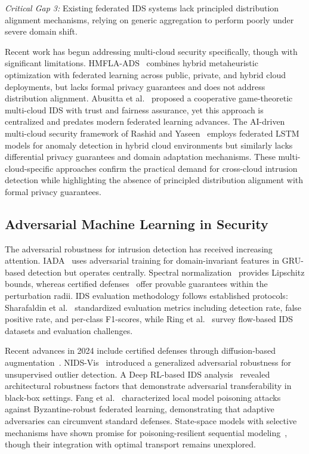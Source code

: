\documentclass{ieeeaccess}
\theoremstyle{plain}
\theoremstyle{definition}
\theoremstyle{remark}
\begin{document}
\textit{Critical Gap 3:} Existing federated IDS systems lack principled distribution alignment mechanisms, relying on generic aggregation to perform poorly under severe domain shift.

Recent work has begun addressing multi-cloud security specifically, though with significant limitations. HMFLA-ADS~\cite{hmfla2025} combines hybrid metaheuristic optimization with federated learning across public, private, and hybrid cloud deployments, but lacks formal privacy guarantees and does not address distribution alignment. Abusitta et al.~\cite{abusitta2019} proposed a cooperative game-theoretic multi-cloud IDS with trust and fairness assurance, yet this approach is centralized and predates modern federated learning advances. The AI-driven multi-cloud security framework of Rashid and Yaseen~\cite{rashid2025} employs federated LSTM models for anomaly detection in hybrid cloud environments but similarly lacks differential privacy guarantees and domain adaptation mechanisms. These multi-cloud-specific approaches confirm the practical demand for cross-cloud intrusion detection while highlighting the absence of principled distribution alignment with formal privacy guarantees.

\subsection{Adversarial Machine Learning in Security}

The adversarial robustness for intrusion detection has received increasing attention. IADA~\cite{chen2023} uses adversarial training for domain-invariant features in GRU-based detection but operates centrally. Spectral normalization~\cite{miyato2018} provides Lipschitz bounds, whereas certified defenses~\cite{tsuzuku2018} offer provable guarantees within the perturbation radii. IDS evaluation methodology follows established protocols: Sharafaldin et al.~\cite{sharafaldin2018} standardized evaluation metrics including detection rate, false positive rate, and per-class F1-scores, while Ring et al.~\cite{ring2019} survey flow-based IDS datasets and evaluation challenges.

Recent advances in 2024 include certified defenses through diffusion-based augmentation~\cite{wang2024diff}. NIDS-Vis~\cite{liu2024} introduced a generalized adversarial robustness for unsupervised outlier detection. A Deep RL-based IDS analysis~\cite{ahmed2024} revealed architectural robustness factors that demonstrate adversarial transferability in black-box settings. Fang et al.~\cite{fang2020local} characterized local model poisoning attacks against Byzantine-robust federated learning, demonstrating that adaptive adversaries can circumvent standard defenses. State-space models with selective mechanisms have shown promise for poisoning-resilient sequential modeling~\cite{anaedevha2026mambashield}, though their integration with optimal transport remains unexplored.
\end{document}
